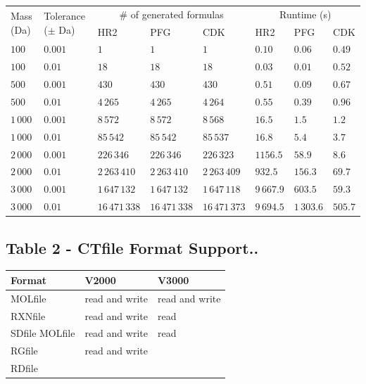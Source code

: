 \documentclass[10pt]{bmcart}
\begin{document}
\begin{backmatter}
    \begin{minipage}{1\textwidth}
    \centering
    \begin{tabular}{llllllll}
	\multirow{2}{*}{ Mass (Da) } & \multirow{2}{*}{ Tolerance ($\pm$ Da) } & \multicolumn{3}{c}{ \# of generated formulas } & \multicolumn{3}{c}{ Runtime (s) } \\
	& & HR2 & PFG & CDK & HR2 & PFG & CDK \\
	$100$ & $0.001$ & $1$ & $1$ & $1$ & $0.10$ & $\mathbf{0.06}$ & $0.49$ \\
	$100$ & $0.01$ & $18$ & $18$ & $18$ & $0.03$ & $\mathbf{0.01}$ & $0.52$ \\
	$500$ & $0.001$ & $430$ & $430$ & $430$ & $0.51$ & $\mathbf{0.09}$ & $0.67$ \\
	$500$ & $0.01$ & $4\,265$ & $4\,265$ & $4\,264$ & $0.55$ & $\mathbf{0.39}$ & $0.96$ \\
	$1\,000$ & $0.001$ & $8\,572$ & $8\,572$ & $8\,568$ & $16.5$ & $1.5$ & $\mathbf{1.2}$ \\
	$1\,000$ & $0.01$ & $85\,542$ & $85\,542$ & $85\,537$ & $16.8$ & $5.4$ & $\mathbf{3.7}$ \\
	$2\,000$ & $0.001$ & $226\,346$ & $226\,346$ & $226\,323$ & $1156.5$ & $58.9$ & $\mathbf{8.6}$ \\
	$2\,000$ & $0.01$ & $2\,263\,410$ & $2\,263\,410$ & $2\,263\,409$ & $932.5$ & $156.3$ & $\mathbf{69.7}$ \\
	$3\,000$ & $0.001$ & $1\,647\,132$ & $1\,647\,132$ & $1\,647\,118$ & $9\,667.9$ & $603.5$ & $\mathbf{59.3}$ \\
	$3\,000$ & $0.01$ & $16\,471\,338$ & $16\,471\,338$ & $16\,471\,373$ & $9\,694.5$ & $1\,303.6$ & $\mathbf{505.7}$ \\
    \end{tabular}
    \end{minipage}

      \subsection*{Table 2 - CTfile Format Support..}\label{tab:ctfileFormats}

    \begin{minipage}{1\textwidth}
    \renewcommand*{\thempfootnote}{\fnsymbol{mpfootnote}}
    \centering
    \begin{tabular}{lll}
  \textbf{Format}            & \textbf{V2000}  & \textbf{V3000} \\ \hline
    MOLfile & read and write & read and write \\
    RXNfile & read and write & read \\
    SDfile MOLfile & read and write & read \\ %
    RGfile & read and write & \\
    RDfile & & \\ %
    \end{tabular}
    \end{minipage}



\end{backmatter}
\end{document}
